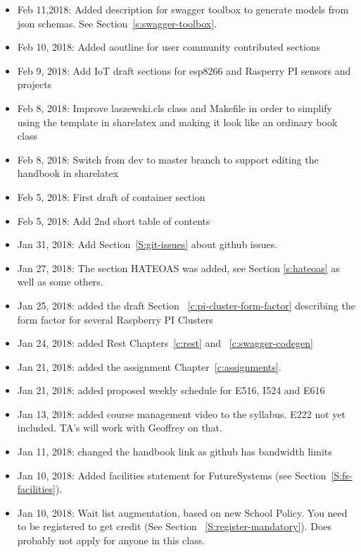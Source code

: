 \begin{itemize}

\item Feb 11,2018: Added description for swagger toolbox to generate
  models from json schemas. See Section~\ref{s:swagger-toolbox}.
\item Feb 10, 2018: Added aoutline for user community contributed
  sections
\item Feb 9, 2018: Add IoT draft sections for esp8266 and Rasperry PI
  sensors and projects
\item Feb 8, 2018: Improve laszewski.cls class and Makefile in order
  to simplify using the template in sharelatex and making it look like
  an ordinary book class
\item Feb 8, 2018: Switch from dev to master branch to support editing
  the handbook in sharelatex
\item Feb 5, 2018: First draft of container section
\item Feb 5, 2018: Add 2nd short table of contents
\item Jan 31, 2018: Add Section~\ref{S:git-issues} about github issues.
\item Jan 27, 2018: The section HATEOAS was added, see
  Section \ref{s:hateoas} as well as some others.
\item Jan 25, 2018: added the draft Section
 ~\ref{c:pi-cluster-form-factor} describing the form factor for
  several Raspberry PI Clusters

\item Jan 24, 2018: added Rest Chapters~\ref{c:rest} and
 ~\ref{c:swagger-codegen}
 
\item Jan 21, 2018: added the assignment Chapter~\ref{c:assignments}.

\item Jan 21, 2018: added proposed weekly schedule for E516, I524 and
  E616

\item Jan 13, 2018: added course management video to the
  syllabus. E222 not yet included. TA's will work with Geoffrey on
  that.

\item Jan 11, 2018: changed the handbook link as github has bandwidth
  limits

\item Jan 10, 2018: Added facilities statement for FutureSystems (see
  Section~\ref{S:fs-facilities}).

\item Jan 10, 2018: Wait list augmentation, based on new School
  Policy. You need to be registered to get credit (See Section
 ~\ref{S:register-mandatory}). Does probably not apply for anyone in
  this class.

\end{itemize}
